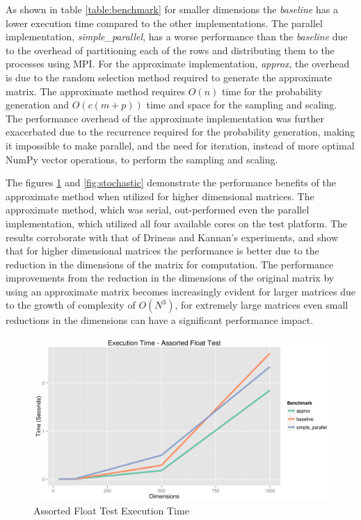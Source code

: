 \documentclass[oneside]{article}
\begin{document}
As shown in table \ref{table:benchmark} for smaller dimensions the \emph{baseline} has a lower execution time compared to the other implementations. The parallel implementation, \emph{simple\_parallel}, has a worse performance than the \emph{baseline} due to the overhead of partitioning each of the rows and distributing them to the processes using MPI. For the approximate implementation, \emph{approx}, the overhead is due to the random selection method required to generate the approximate matrix. The approximate method requires $O(n)$ time for the probability generation and $O(c(m + p))$ time and space for the sampling and scaling\cite{drineas2001fast, mahoneyCS369M, mahoneyCS294}. The performance overhead of the approximate implementation was further exacerbated due to the recurrence required for the probability generation, making it impossible to make parallel, and the need for iteration, instead of more optimal NumPy vector operations, to perform the sampling and scaling. 


The figures \ref{fig:assorted_float} and \ref{fig:stochastic} demonstrate the performance benefits of the approximate method when utilized for higher dimensional matrices. The approximate method, which was serial, out-performed even the parallel implementation, which utilized all four available cores on the test platform. The results corroborate with that of Drineas and Kannan's experiments, and show that for higher dimensional matrices the performance is better due to the reduction in the dimensions of the matrix for computation\cite{drineas2001fast}. The performance improvements from the reduction in the dimensions of the original matrix by using an approximate matrix becomes increasingly evident for larger matrices due to the growth of complexity of $O(N^{3})$, for extremely large matrices even small reductions in the dimensions can have a significant performance impact.


\begin{figure}[ht!]
\centering
\includegraphics[width=\textwidth]{figures/assorted_float}
\caption{Assorted Float Test Execution Time}
\label{fig:assorted_float}
\end{figure}
\end{document}
